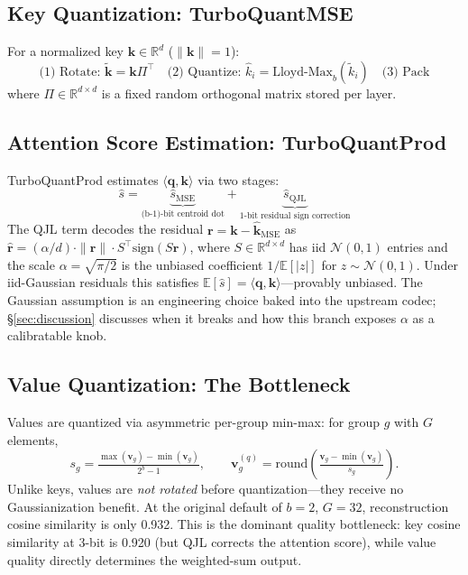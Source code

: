 \documentclass{article}
\newcommand{\bm}[1]{\boldsymbol{#1}}
\newcommand{\Eop}{\mathbb{E}}
\newcommand{\R}{\mathbb{R}}
\begin{document}
\subsection{Key Quantization: TurboQuantMSE}

For a normalized key $\bm{k} \in \R^d$ ($\|\bm{k}\|=1$):
\[
\text{(1) Rotate: } \tilde{\bm{k}} = \bm{k}\Pi^\top \quad
\text{(2) Quantize: } \hat{k}_i = \text{Lloyd-Max}_{b}(\tilde{k}_i) \quad
\text{(3) Pack}
\]
where $\Pi \in \R^{d \times d}$ is a fixed random orthogonal matrix stored per layer.

\subsection{Attention Score Estimation: TurboQuantProd}

TurboQuantProd estimates $\langle \bm{q}, \bm{k} \rangle$ via two stages:
\[
\hat{s} = \underbrace{\hat{s}_\text{MSE}}_{\text{(b-1)-bit centroid dot}} + \underbrace{\hat{s}_\text{QJL}}_{\text{1-bit residual sign correction}}
\]
The QJL term decodes the residual $\bm{r} = \bm{k} - \hat{\bm{k}}_\text{MSE}$ as $\hat{\bm{r}} = (\alpha/d) \cdot \|\bm{r}\| \cdot S^\top \mathrm{sign}(S\bm{r})$, where $S \in \R^{d \times d}$ has iid $\mathcal{N}(0,1)$ entries and the scale $\alpha = \sqrt{\pi/2}$ is the unbiased coefficient $1/\Eop[|z|]$ for $z \sim \mathcal{N}(0,1)$. Under iid-Gaussian residuals this satisfies $\Eop[\hat{s}] = \langle \bm{q}, \bm{k} \rangle$—provably unbiased. The Gaussian assumption is an engineering choice baked into the upstream codec; \S\ref{sec:discussion} discusses when it breaks and how this branch exposes $\alpha$ as a calibratable knob.

\subsection{Value Quantization: The Bottleneck}
\label{sec:value_bottleneck}

Values are quantized via asymmetric per-group min-max: for group $g$ with $G$ elements,
\[
s_g = \tfrac{\max(\bm{v}_g) - \min(\bm{v}_g)}{2^b - 1}, \qquad
\bm{v}_g^{(q)} = \text{round}\!\left(\tfrac{\bm{v}_g - \min(\bm{v}_g)}{s_g}\right).
\]
Unlike keys, values are \emph{not rotated} before quantization—they receive no Gaussianization benefit. At the original default of $b=2$, $G=32$, reconstruction cosine similarity is only 0.932. This is the dominant quality bottleneck: key cosine similarity at 3-bit is 0.920 (but QJL corrects the attention score), while value quality directly determines the weighted-sum output.
\end{document}
